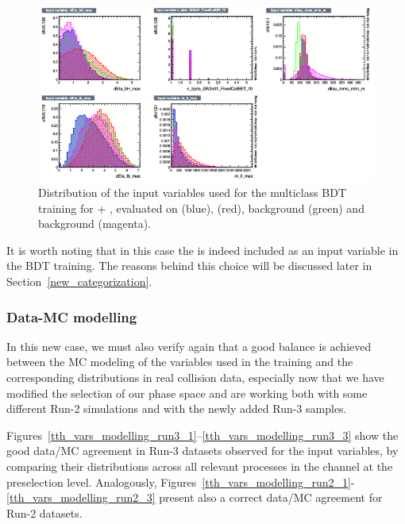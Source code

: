  \begin{figure}[htbp]
    \centering
    \includegraphics[width=0.95\linewidth]{images/plots_tH_tHqb_for_thesis/variables_id_c5.png}
    \caption{Distribution of the input variables used for the multiclass BDT training for \thtt + \ttHtt, evaluated on \ttHtt (blue), \thtt (red), \ztautau background (green) and \ttbar background (magenta).}
    \label{th_tth_vars_tmva_3}
\end{figure}

It is worth noting that in this case the \mmc is indeed included as an input variable in the BDT training. The reasons behind this choice will be discussed later in Section~\ref{new_categorization}.

\subsubsection*{Data-MC modelling}

In this new case, we must also verify again that a good balance is achieved between the MC modeling of the variables used in the training and the corresponding distributions in real collision data, especially now that we have modified the selection of our phase space and are working both with some different Run-2 simulations and with the newly added Run-3 samples.

Figures~\ref{tth_vars_modelling_run3_1}–\ref{tth_vars_modelling_run3_3} show the good data/MC agreement in Run-3 datasets observed for the input variables, by comparing their distributions across all relevant processes in the channel at the preselection level. Analogously, Figures~\ref{tth_vars_modelling_run2_1}-\ref{tth_vars_modelling_run2_3} present also a correct data/MC agreement for Run-2 datasets.

